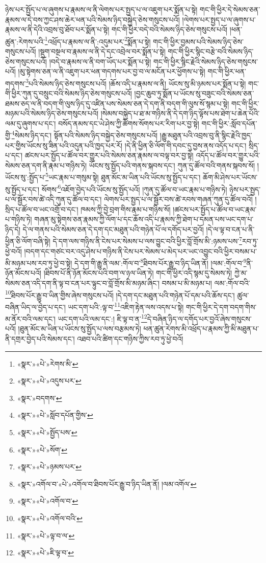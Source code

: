 ཉེས་པར་སྤྱོད་པ་ལ་ཞུགས་པ་རྣམས་ལ་ནི་ལེགས་པར་སྤྱད་པ་ལ་འཇུག་པར་སྨོན་པ་སྟེ། གང་གི་ཕྱིར་དེ་སེམས་ཅན་རྣམས་ལ་དེ་བས་ཀྱང་ཤས་ཆེར་ཕན་པའི་སེམས་ཉིད་བསྐྱེད་ཅེས་གསུངས་པའོ། །ལེགས་པར་སྤྱད་པ་ལ་ཞུགས་པ་རྣམས་ལ་ནི་དེའི་འབྲས་བུ་ཐོབ་པར་སྨོན་པ་སྟེ། གང་གི་ཕྱིར་བདེ་བའི་སེམས་ཉིད་ཅེས་གསུངས་པའོ། །ཕན་ཚུན་:རེགས་པའི་\footnote{«སྣར་»«པེ་»རེགས་མི་}འཕྲོད་པ་རྣམས་ལ་ནི་:འདུམ་པར་\footnote{«སྣར་»«པེ་»འདུས་པར་}སྨོན་པ་སྟེ། གང་གི་ཕྱིར་བྱམས་པའི་སེམས་ཉིད་ཅེས་གསུངས་པའོ། །སྡུག་བསྔལ་བ་རྣམས་ལ་ནི་དེ་དང་འབྲེལ་བར་སྨོན་པ་སྟེ། གང་གི་ཕྱིར་སྙིང་བརྩེ་བའི་སེམས་ཉིད་ཅེས་གསུངས་པའོ། །བདེ་བ་རྣམས་ལ་ནི་བག་ཡོད་པར་སྨོན་པ་སྟེ། གང་གི་ཕྱིར་སྙིང་རྗེའི་སེམས་ཉིད་ཅེས་གསུངས་པའོ། །མུ་སྟེགས་ཅན་ལ་ནི་འཇུག་པར་ཕན་གདགས་པར་བྱ་བ་ལ་མངོན་པར་ཕྱོགས་པ་སྟེ། གང་གི་ཕྱིར་ཕན་གདགས་\footnote{«སྣར་»བདགས་}པའི་སེམས་ཉིད་ཅེས་གསུངས་པའོ། །ཆོས་འདི་པ་རྣམས་ལ་ནི། ཡོངས་སུ་མི་ཉམས་པར་སྨོན་པ་སྟེ། གང་གི་ཕྱིར་ཀུན་དུ་བསྲུང་བའི་སེམས་ཉིད་ཅེས་གསུངས་པའོ། །བྱང་ཆུབ་ཏུ་སྨོན་པ་ཡོངས་སུ་བཟུང་བའི་སེམས་ཅན་ཐམས་ཅད་ལ་ནི་བདག་གི་ལུས་ཉིད་དུ་འཛིན་པས་སེམས་ཅན་དེ་དག་ནི་བདག་གི་ལུས་སོ་སྙམ་པ་སྟེ། གང་གི་ཕྱིར་མཉམ་པའི་སེམས་ཉིད་ཅེས་གསུངས་པའོ། །སེམས་བསྐྱེད་པ་ཐ་མ་གཉིས་ནི་དེ་དག་ཉིད་ལྟོས་པས་ཐེག་པ་ཆེན་པོའི་ལམ་དུ་ཞུགས་པ་དང་། བསོད་ནམས་དང་ཡེ་ཤེས་ཀྱི་ཚོགས་སོགས་པར་རིག་པར་བྱ་སྟེ། གང་གི་ཕྱིར་:སློབ་དཔོན་གྱི་\footnote{«སྣར་»«པེ་»སློབ་དཔོན་གྱིས་}སེམས་ཉིད་དང་། སྟོན་པའི་སེམས་ཉིད་བསྐྱེད་ཅེས་གསུངས་པའོ། །རྒྱུ་མཐུན་པའི་འབྲས་བུ་ནི་སྙིང་རྗེའི་ཁྱད་པར་གྱིས་ཡོངས་སུ་ཟིན་པའི་འདུན་པའི་ཁྱད་པར་རོ། །དེ་ནི་ཕྱིན་ཅི་ལོག་གི་དབང་དུ་བྱས་ནས་འདོད་པ་དང་། སྲིད་པ་དང་། ཚངས་པར་སྤྱོད་པ་ཚོལ་བར་གྱུར་པའི་སེམས་ཅན་རྣམས་ལ་བལྟ་བར་བྱ་སྟེ། འདོད་པ་ཚོལ་བར་གྱུར་པའི་སེམས་ཅན་དག་ནི་རྣམ་པ་གཉིས་ཏེ། ཡོངས་སུ་སྤྱོད་པའི་གནས་སྐབས་དང་། ཀུན་དུ་ཚོལ་བའི་གནས་སྐབས་སོ། །ཡོངས་སུ་:སྤྱོད་པ་\footnote{«སྣར་»«པེ་»སྤྱོད་པས་}ཡང་རྣམ་པ་གསུམ་སྟེ། ཐུན་མོང་མ་ཡིན་པའི་ཡོངས་སུ་སྤྱོད་པ་དང་། ཆོག་མི་ཤེས་པར་ཡོངས་སུ་སྤྱོད་པ་དང་། སོགས་\footnote{«སྣར་»«པེ་»སོག་}འཇོག་བྱེད་པའི་ཡོངས་སུ་སྤྱོད་པའོ། །ཀུན་དུ་ཚོལ་བ་ཡང་རྣམ་པ་གཉིས་ཏེ། ཉེས་པར་སྤྱད་པ་ལ་སྦྱོར་བས་ཚེ་འདི་ཀུན་དུ་ཚོལ་བ་དང་། ལེགས་པར་སྤྱད་པ་ལ་སྦྱོར་བས་ཚེ་རབས་གཞན་ཀུན་དུ་ཚོལ་བའོ། །སྲིད་པ་ཚོལ་བ་ཡང་འགྲོ་བ་དང་། ཁམས་ཀྱི་བྱེ་བྲག་གིས་རྣམ་པ་གཉིས་སོ། །ཚངས་པར་སྤྱོད་པ་ཚོལ་བ་ཡང་རྣམ་པ་གཉིས་ཏེ། གཞན་མུ་སྟེགས་ཅན་རྣམས་ཀྱི་ལོག་པ་དང་ཆོས་འདི་པ་རྣམས་ཀྱི་ཐེག་པ་དམན་པས་ཡང་དག་པ་ཉིད་དེ། དེ་ལ་གནས་པའི་སེམས་ཅན་དེ་དག་དང་མཐུན་པའི་གཉེན་པོ་ལ་དགོད་པར་བྱའོ། །དེ་ལ་ལྟ་བ་ངན་པ་ནི་ཕྱིན་ཅི་ལོག་བཞི་སྟེ། དེ་དག་ལས་གཉིས་ནི་ངེས་པར་སེམས་པ་ལས་བྱུང་བའི་ཕྱིར་བློ་གྲོས་མི་:ཉམས་པས་\footnote{«སྣར་»«པེ་»ཉམས་པར་}རབ་ཏུ་ཕྱེ་བའོ། །བདག་དང་གཙང་བར་འདུ་ཤེས་པ་གཉིས་ནི་ངེས་པར་སེམས་པ་མེད་པར་ཡང་འབྱུང་བའི་ཕྱིར་བསམ་པ་མི་མཉམ་པས་རབ་ཏུ་ཕྱེ་བ་སྟེ། དེ་དག་གི་རྒྱུ་ནི་ལམ་:གོལ་བ་\footnote{«སྣར་»འགོལ་བ་«པེ་»འགོལ་བ་ཐིབས་པོར་རྒྱུ་བ་ཉིད་ཡིན་ནོ། །ལམ་འགོལ་}ཐིབས་པོར་རྒྱུ་བ་ཉིད་ཡིན་ནོ། །ལམ་:གོལ་བ་\footnote{«སྣར་»«པེ་»འགོལ་བ་}ནི་ཉོན་མོངས་པའོ། །ཐིབས་པོ་ནི་ཉོན་མོངས་པའི་བག་ལ་ཉལ་ཡིན་ཏེ། གང་གི་ཕྱིར་འདི་སྙམ་དུ་སེམས་ཏེ། ཀྱེ་མ་སེམས་ཅན་འདི་དག་ནི་ལྟ་བ་ངན་པར་ལྟུང་བ་བློ་གྲོས་མི་མཉམ་ཞིང་། བསམ་པ་མི་མཉམ་པ། ལམ་:གོལ་བའི་\footnote{«སྣར་»«པེ་»འགོལ་བའི་}ཐིབས་པོར་རྒྱུ་བ་ཡིན་གྱིས་ཞེས་གསུངས་པའོ། །དེ་དག་དང་མཐུན་པའི་གཉེན་པོ་དམ་པའི་ཆོས་དང་། ཚུལ་བཞིན་ཡིད་ལ་བྱེད་པ་དང་། ཡང་དག་པའི་:ལྟ་བ་\footnote{«སྣར་»«པེ་»ལྟ་བ་ལ་}འཇིག་རྟེན་ལས་འདས་པ་སྟེ། གང་གི་ཕྱིར་དེ་དག་བདག་གིས་མ་ནོར་བའི་ལམ་དང་། ཡང་དག་པའི་ལམ་དང་:། ཇི་ལྟ་བ་ན་\footnote{«སྣར་»«པེ་»ཇི་ལྟ་བ་}དེ་བཞིན་ཉིད་ལ་དགོད་པར་བྱའོ་ཞེས་གསུངས་པའོ། །ཐུན་མོང་མ་ཡིན་པ་ཡོངས་སུ་སྤྱོད་པ་ལས་བརྩམས་ཏེ། ཕན་ཚུན་རེགས་མི་འཕྲོད་པ་རྣམས་ཀྱི་མི་མཐུན་པ་ནི་དགྲར་བྱེད་པའི་སེམས་དང་། འཐབ་པའི་ཚིག་དང་གཉིས་ཀྱིས་རབ་ཏུ་ཕྱེ་བའོ། 